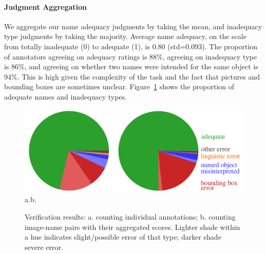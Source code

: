 
\paragraph{Judgment Aggregation}
We aggregate our name adequacy judgments by taking the mean, and inadequacy type judgments by taking the majority.
Average name adequacy, on the scale from totally inadequate (0) to adequate (1), is 0.80 (\mbox{std=$0.093$}).
The proportion of annotators agreeing on adequacy ratings is 88\%, agreeing on inadequacy type is 86\%, and agreeing on whether two names were intended for the same object is 94\%.
This is high given the complexity of the task
and the fact that pictures and bounding boxes are sometimes unclear.
Figure~\ref{fig:verification-piechart} shows the proportion of adequate names and inadequacy types.
\begin{figure}[t]
	\centering
	\includegraphics[width=\columnwidth]{images/verification_piechart_double.pdf}\\
	\hspace*{\fill}a.\hspace*{\fill}\hspace*{\fill}b.\hspace*{\fill}\hspace*{\fill}
	\caption{Verification results: a. counting individual annotations; b. counting image-name pairs with their aggregated scores. Lighter shade within a hue indicates slight/possible error of that type; darker shade severe error.}
	\label{fig:verification-piechart}
\end{figure}


